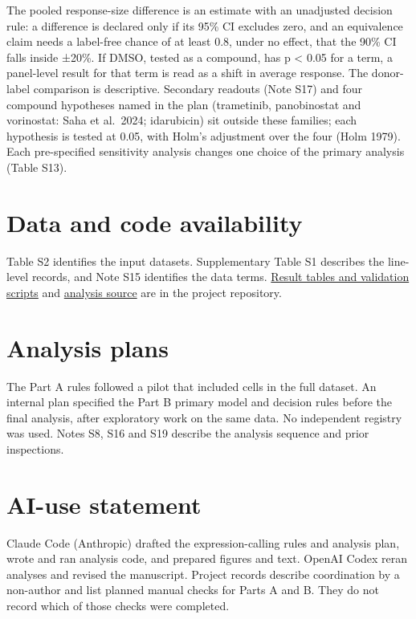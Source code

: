 \documentclass[
  11pt,
  letterpaper,
]{article}
\begin{document}
The pooled response-size difference is an estimate with an unadjusted
decision rule: a difference is declared only if its 95\% CI excludes
zero, and an equivalence claim needs a label-free chance of at least
0.8, under no effect, that the 90\% CI falls inside ±20\%. If DMSO,
tested as a compound, has p \textless{} 0.05 for a term, a panel-level
result for that term is read as a shift in average response. The
donor-label comparison is descriptive. Secondary readouts (Note S17) and
four compound hypotheses named in the plan (trametinib, panobinostat and
vorinostat: Saha et al.~2024; idarubicin) sit outside these families;
each hypothesis is tested at 0.05, with Holm's adjustment over the four
(Holm 1979). Each pre-specified sensitivity analysis changes one choice
of the primary analysis (Table S13).

\section*{Data and code availability}\label{data-and-code-availability}

Table S2 identifies the input datasets. Supplementary Table S1 describes
the line-level records, and Note S15 identifies the data terms.
\href{https://github.com/MateenahJAHAN/Project-59-CMAP-Sex-Differences/tree/main/verification}{Result
tables and validation scripts} and
\href{https://github.com/MateenahJAHAN/Project-59-CMAP-Sex-Differences/tree/main/analysis}{analysis
source} are in the project repository.

\section*{Analysis plans}\label{analysis-plans}

The Part A rules followed a pilot that included cells in the full
dataset. An internal plan specified the Part B primary model and
decision rules before the final analysis, after exploratory work on the
same data. No independent registry was used. Notes S8, S16 and S19
describe the analysis sequence and prior inspections.

\section*{AI-use statement}\label{ai-use-statement}

Claude Code (Anthropic) drafted the expression-calling rules and
analysis plan, wrote and ran analysis code, and prepared figures and
text. OpenAI Codex reran analyses and revised the manuscript. Project
records describe coordination by a non-author and list planned manual
checks for Parts A and B. They do not record which of those checks were
completed.
\end{document}
